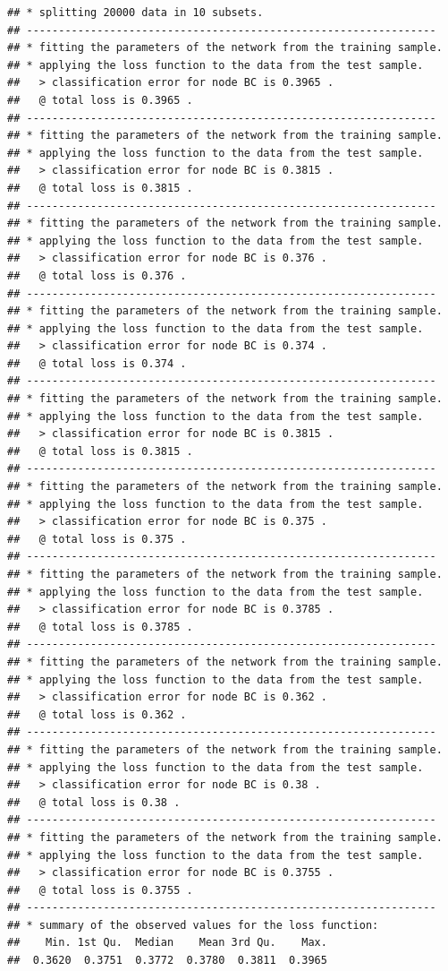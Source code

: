 \documentclass[]{article}
\begin{document}
\begin{verbatim}
## * splitting 20000 data in 10 subsets.
## ----------------------------------------------------------------
## * fitting the parameters of the network from the training sample.
## * applying the loss function to the data from the test sample.
##   > classification error for node BC is 0.3965 .
##   @ total loss is 0.3965 .
## ----------------------------------------------------------------
## * fitting the parameters of the network from the training sample.
## * applying the loss function to the data from the test sample.
##   > classification error for node BC is 0.3815 .
##   @ total loss is 0.3815 .
## ----------------------------------------------------------------
## * fitting the parameters of the network from the training sample.
## * applying the loss function to the data from the test sample.
##   > classification error for node BC is 0.376 .
##   @ total loss is 0.376 .
## ----------------------------------------------------------------
## * fitting the parameters of the network from the training sample.
## * applying the loss function to the data from the test sample.
##   > classification error for node BC is 0.374 .
##   @ total loss is 0.374 .
## ----------------------------------------------------------------
## * fitting the parameters of the network from the training sample.
## * applying the loss function to the data from the test sample.
##   > classification error for node BC is 0.3815 .
##   @ total loss is 0.3815 .
## ----------------------------------------------------------------
## * fitting the parameters of the network from the training sample.
## * applying the loss function to the data from the test sample.
##   > classification error for node BC is 0.375 .
##   @ total loss is 0.375 .
## ----------------------------------------------------------------
## * fitting the parameters of the network from the training sample.
## * applying the loss function to the data from the test sample.
##   > classification error for node BC is 0.3785 .
##   @ total loss is 0.3785 .
## ----------------------------------------------------------------
## * fitting the parameters of the network from the training sample.
## * applying the loss function to the data from the test sample.
##   > classification error for node BC is 0.362 .
##   @ total loss is 0.362 .
## ----------------------------------------------------------------
## * fitting the parameters of the network from the training sample.
## * applying the loss function to the data from the test sample.
##   > classification error for node BC is 0.38 .
##   @ total loss is 0.38 .
## ----------------------------------------------------------------
## * fitting the parameters of the network from the training sample.
## * applying the loss function to the data from the test sample.
##   > classification error for node BC is 0.3755 .
##   @ total loss is 0.3755 .
## ----------------------------------------------------------------
## * summary of the observed values for the loss function:
##    Min. 1st Qu.  Median    Mean 3rd Qu.    Max. 
##  0.3620  0.3751  0.3772  0.3780  0.3811  0.3965
\end{verbatim}
\end{document}
